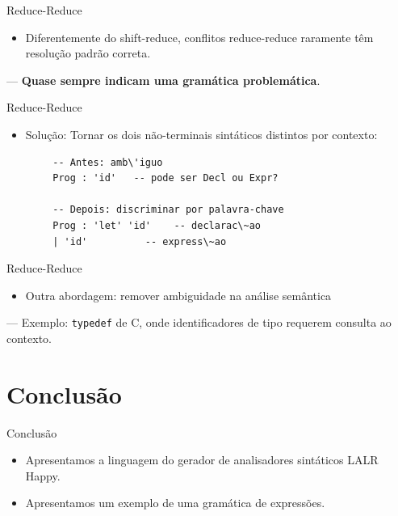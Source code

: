\begin{frame}{Reduce-Reduce}

    \begin{itemize}

        \item
        Diferentemente do shift-reduce, conflitos reduce-reduce raramente têm
        resolução padrão correta.
    \end{itemize}

    --- \textbf{Quase sempre indicam uma gramática problemática}.
\end{frame}

\begin{frame}[fragile]{Reduce-Reduce}

    \begin{itemize}

        \item
        Solução: Tornar os dois não-terminais sintáticos distintos por
        contexto:
    \end{itemize}

    \begin{lstlisting}
        -- Antes: amb\'iguo
        Prog : 'id'   -- pode ser Decl ou Expr?

        -- Depois: discriminar por palavra-chave
        Prog : 'let' 'id'    -- declarac\~ao
        | 'id'          -- express\~ao
    \end{lstlisting}
\end{frame}

\begin{frame}[fragile]{Reduce-Reduce}

    \begin{itemize}

        \item
        Outra abordagem: remover ambiguidade na análise semântica
    \end{itemize}

    --- Exemplo: \texttt{typedef} de C, onde
    identificadores de tipo requerem consulta ao contexto.
\end{frame}


\section{Conclusão}\label{conclusuxe3o}

\begin{frame}{Conclusão}

    \begin{itemize}
        \item
        Apresentamos a linguagem do gerador de analisadores sintáticos LALR
        Happy.
        \item
        Apresentamos um exemplo de uma gramática de expressões.
    \end{itemize}
\end{frame}
